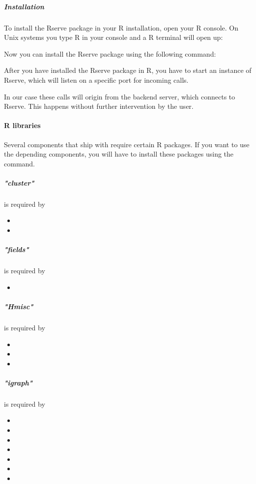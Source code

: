 	\subparagraph{Installation} To install the Rserve package in your R installation, open your R console. On Unix systems you type R in your console and a R terminal will open up:
	
	
	Now you can install the Rserve package using the following command:
	
	
	After you have installed the Rserve package in R, you have to start an instance of Rserve, which will listen on a specific port for incoming calls.
	
	
	 In our case these calls will origin from the backend server, which connects to Rserve. This happens without further intervention by the user.
	
	\paragraph{R libraries}
	Several components that ship with \clusteval require certain R packages. If you want to use the depending components, you will have to install these packages using the  command.
	
	
	\subparagraph{"cluster"} is required by
	\begin{itemize}		
		\item {}
		\item {}
\end{itemize}

	\subparagraph{"fields"} is required by
	\begin{itemize}		
		\item {}
\end{itemize}
	
	\subparagraph{"Hmisc"} is required by
	\begin{itemize}
		\item {}
		\item {}
		\item {}
	\end{itemize}
	
	\subparagraph{"igraph"} is required by
	\begin{itemize}		
		\item {}
		\item {}
		\item {}
		\item {}
		\item {}
		\item {}
		\item {}
\end{itemize}
	
